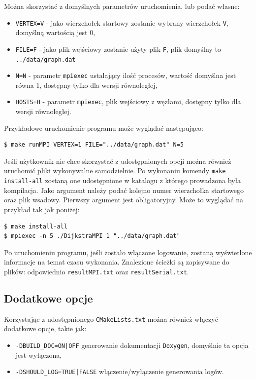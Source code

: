 \documentclass[12pt]{article}
\begin{document}
\noindent
Można skorzystać z domyślnych parametrów uruchomienia, lub podać własne:
\begin{itemize}
\item  \lstinline|VERTEX=V| - jako wierzchołek startowy zostanie wybrany wierzchołek \lstinline|V|, domyślną wartością jest $0$,
\item  \lstinline|FILE=F| - jako plik wejściowy zostanie użyty plik \lstinline|F|, plik domyślny to \lstinline{../data/graph.dat}
\item  \lstinline|N=N| - parametr \lstinline|mpiexec| ustalający ilość procesów, wartość domyślna jest równa $1$, dostępny tylko dla wersji równoległej,
\item  \lstinline|HOSTS=H| -  parametr \lstinline|mpiexec|, plik wejściowy z węzłami, dostępny tylko dla wersji równoległej.
\end{itemize}

\noindent
Przykładowe uruchomienie programu może wyglądać następująco:
\begin{lstlisting}
$ make runMPI VERTEX=1 FILE="../data/graph.dat" N=5
\end{lstlisting}

Jeśli użytkownik nie chce skorzystać z udostępnionych opcji można również uruchomić pliki wykonywalne samodzielnie. Po wykonaniu komendy \lstinline|make install-all| zostaną one udostępnione w katalogu z którego prowadzona była kompilacja. Jako argument należy podać kolejno numer wierzchołka startowego oraz plik wsadowy. Pierwszy argument jest obligatoryjny. Może to wyglądać na przykład tak jak poniżej:

\begin{lstlisting}
$ make install-all
$ mpiexec -n 5 ./DijkstraMPI 1 "../data/graph.dat"
\end{lstlisting}

Po uruchomieniu programu, jeśli zostało włączone logowanie, zostaną wyświetlone informacje na temat czasu wykonania. Znalezione ścieżki są zapisywane do plików: odpowiednio \lstinline|resultMPI.txt| oraz \lstinline|resultSerial.txt|.

\subsection{Dodatkowe opcje}
Korzystając z udostępnionego \lstinline|CMakeLists.txt| można również włączyć dodatkowe opcje, takie jak:
\begin{itemize}
\item \lstinline+-DBUILD_DOC=ON|OFF+ generowanie dokumentacji \lstinline|Doxygen|, domyślnie ta opcja jest wyłączona,
\item \lstinline+-DSHOULD_LOG=TRUE|FALSE+ włączenie/wyłączenie generowania logów.
\end{itemize}
\end{document}
